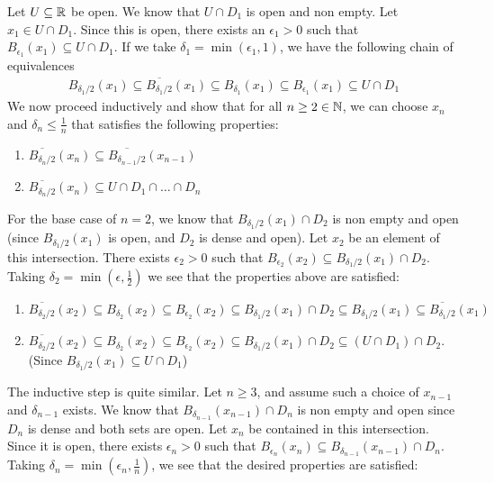 \documentclass{article}
\begin{document}
 {
    Let $U\subseteq \mathbb{R}$ be open. We know that $U\cap D_{1}$ is open and non empty. Let $x_{1}\in U\cap D_{1}$. Since this is open, there exists an $\epsilon_{1} > 0$ such that $B_{\epsilon_{1}}(x_{1})\subseteq U \cap D_{1}$. If we take $\delta_{1} = \min(\epsilon_{1}, 1)$, we have the following chain of equivalences
    \begin{align*}
        B_{\delta_{1}/2}(x_{1})\subseteq \overline{B_{\delta_{1}/2}}(x_{1})\subseteq B_{\delta_{1}}(x_{1})\subseteq B_{\epsilon_{1}}(x_{1})\subseteq U\cap D_{1}
    \end{align*}
    We now proceed inductively and show that for all $n\geq 2\in \mathbb{N}$, we can choose $x_{n}$ and $\delta_{n}\leq \frac{1}{n}$ that satisfies the following properties:
    \begin{enumerate}
        \item $\overline{B_{\delta_{n}/2}}(x_{n})\subseteq \overline{B_{\delta_{n-1}/2}}(x_{n-1})$
        \item $\overline{B_{\delta_{n}/2}}(x_{n})\subseteq U\cap D_{1}\cap \dots \cap D_{n}$
    \end{enumerate}
    For the base case of $n = 2$, we know that $B_{\delta_{1}/2}(x_{1})\cap D_{2}$ is non empty and open (since $B_{\delta_{1}/2}(x_{1})$ is open, and $D_{2}$ is dense and open). Let $x_{2}$ be an element of this intersection. There exists $\epsilon_{2} > 0$ such that $B_{\epsilon_{2}}(x_{2})\subseteq B_{\delta_{1}/2}(x_{1})\cap D_{2}$. Taking $\delta_{2} = \min\left(\epsilon, \frac{1}{2}\right)$ we see that the properties above are satisfied:
    \begin{enumerate}
        \item $\overline{B_{\delta_{2}/2}}(x_{2})\subseteq B_{\delta_{2}}(x_{2})\subseteq B_{\epsilon_{2}}(x_{2})\subseteq B_{\delta_{1}/2}(x_{1})\cap D_{2}\subseteq B_{\delta_{1}/2}(x_{1})\subseteq \overline{B_{\delta_{1}/2}}(x_{1})$
        \item $\overline{B_{\delta_{2}/2}}(x_{2})\subseteq B_{\delta_{2}}(x_{2})\subseteq B_{\epsilon_{2}}(x_{2})\subseteq B_{\delta_{1}/2}(x_{1})\cap D_{2}\subseteq (U\cap D_{1})\cap D_{2}$. (Since $B_{\delta_{1}/2}(x_{1})\subseteq U\cap D_{1}$)
    \end{enumerate}
    The inductive step is quite similar. Let $n\geq 3$, and assume such a choice of $x_{n-1}$ and $\delta_{n-1}$ exists. We know that $B_{\delta_{n-1}}(x_{n-1})\cap D_{n}$ is non empty and open since $D_{n}$ is dense and both sets are open. Let $x_{n}$ be contained in this intersection. Since it is open, there exists $\epsilon_{n} > 0 $ such that $B_{\epsilon_{n}}(x_{n})\subseteq B_{\delta_{n-1}}(x_{n-1})\cap D_{n}$. Taking $\delta_{n} = \min\left(\epsilon_{n},\frac{1}{n}\right)$, we see that the desired properties are satisfied:
}
\end{document}

